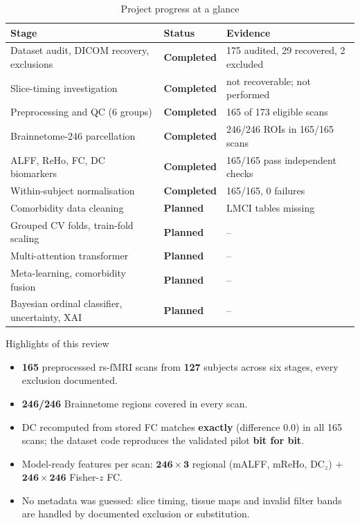 \documentclass{ssnreview}
\newcommand{\statusdone}{\textcolor{DoneGreen}{\textbf{Completed}}}
\newcommand{\statusplan}{\textcolor{PlanOrange}{\textbf{Planned}}}
\begin{document}
\begin{table}[H]
\centering
\caption{Project progress at a glance}\label{tab:status}
\small
\begin{tabularx}{\textwidth}{>{\raggedright\arraybackslash}p{5.2cm}>{\centering\arraybackslash}p{2.2cm}X}
\toprule
Stage & Status & Evidence\\
\midrule
Dataset audit, DICOM recovery, exclusions & \statusdone & 175 audited, 29 recovered, 2 excluded\\
Slice-timing investigation & \statusdone & not recoverable; not performed\\
Preprocessing and QC (6 groups) & \statusdone & 165 of 173 eligible scans\\
Brainnetome-246 parcellation & \statusdone & 246/246 ROIs in 165/165 scans\\
ALFF, ReHo, FC, DC biomarkers & \statusdone & 165/165 pass independent checks\\
Within-subject normalisation & \statusdone & 165/165, 0 failures\\
Comorbidity data cleaning & \statusplan & LMCI tables missing\\
Grouped CV folds, train-fold scaling & \statusplan & --\\
Multi-attention transformer & \statusplan & --\\
Meta-learning, comorbidity fusion & \statusplan & --\\
Bayesian ordinal classifier, uncertainty, XAI & \statusplan & --\\
\bottomrule
\end{tabularx}
\end{table}

\begin{keybox}{Highlights of this review}
\begin{itemize}[leftmargin=*, itemsep=1pt]
  \item \textbf{165} preprocessed rs-fMRI scans from \textbf{127} subjects
        across six stages, every exclusion documented.
  \item \textbf{246/246} Brainnetome regions covered in every scan.
  \item DC recomputed from stored FC matches \textbf{exactly} (difference
        0.0) in all 165 scans; the dataset code reproduces the validated
        pilot \textbf{bit for bit}.
  \item Model-ready features per scan: $\mathbf{246\times3}$ regional
        (mALFF, mReHo, DC$_z$) $+$ $\mathbf{246\times246}$ Fisher-$z$ FC.
  \item No metadata was guessed: slice timing, tissue maps and invalid
        filter bands are handled by documented exclusion or substitution.
\end{itemize}
\end{keybox}
\end{document}
